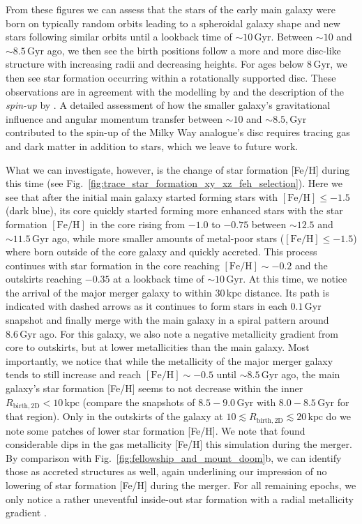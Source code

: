 \documentclass[fleqn,usenatbib]{mnras}
\begin{document}
From these figures we can assess that the stars of the early main galaxy were born on typically random orbits leading to a spheroidal galaxy shape and new stars following similar orbits until a lookback time of $\sim 10\,\mathrm{Gyr}$. Between $\sim10$ and $\sim 8.5\,\mathrm{Gyr}$ ago, we then see the birth positions follow a more and more disc-like structure with increasing radii and decreasing heights. For ages below $8\,\mathrm{Gyr}$, we then see star formation occurring within a rotationally supported disc. These observations are in agreement with the modelling by \citet{MCM2013} and the description of the \textit{spin-up} by \citet{Belokurov2022}. A detailed assessment of how the smaller galaxy’s gravitational influence and angular momentum transfer between $\sim10$ and $\sim8.5,\mathrm{Gyr}$ contributed to the spin-up of the Milky Way analogue’s disc requires tracing gas and dark matter in addition to stars, which we leave to future work.

What we can investigate, however, is the change of star formation [Fe/H] during this time (see Fig.~\ref{fig:trace_star_formation_xy_xz_feh_selection}). Here we see that after the initial main galaxy started forming stars with $\mathrm{[Fe/H]} \leq -1.5$ (dark blue), its core quickly started forming more enhanced stars with the star formation $\mathrm{[Fe/H]}$ in the core rising from $-1.0$ to $-0.75$ between $\sim 12.5$ and $\sim11.5\,\mathrm{Gyr}$ ago, while more smaller amounts of metal-poor stars ($\mathrm{[Fe/H]} \leq -1.5$) where born outside of the core galaxy and quickly accreted. This process continues with star formation in the core reaching $\mathrm{[Fe/H]} \sim -0.2$ and the outskirts reaching $-0.35$ at a lookback time of $\sim 10\,\mathrm{Gyr}$. At this time, we notice the arrival of the major merger galaxy to within $30\,\mathrm{kpc}$ distance. Its path is indicated with dashed arrows as it continues to form stars in each $0.1\,\mathrm{Gyr}$ snapshot and finally merge with the main galaxy in a spiral pattern around $8.6\,\mathrm{Gyr}$ ago. For this galaxy, we also note a negative metallicity gradient from core to outskirts, but at lower metallicities than the main galaxy. Most importantly, we notice that while the metallicity of the major merger galaxy tends to still increase and reach $\mathrm{[Fe/H]} \sim -0.5$ until $\sim 8.5\,\mathrm{Gyr}$ ago, the main galaxy's star formation [Fe/H] seems to not decrease within the inner $R_\mathrm{birth,2D} < 10\,\mathrm{kpc}$ (compare the snapshots of $8.5-9.0\,\mathrm{Gyr}$ with $8.0-8.5\,\mathrm{Gyr}$ for that region). Only in the outskirts of the galaxy at $10 \lesssim R_\mathrm{birth, 2D} \lesssim 20\,\mathrm{kpc}$ do we note some patches of lower star formation [Fe/H]. We note that \citet{Buck2023} found considerable dips in the gas metallicity [Fe/H] this simulation during the merger. By comparison with Fig.~\ref{fig:fellowship_and_mount_doom}b, we can identify those as accreted structures as well, again underlining our impression of no lowering of star formation [Fe/H] during the merger. For all remaining epochs, we only notice a rather uneventful inside-out star formation with a radial metallicity gradient \citep[see also][]{Buder2025}.
\end{document}
